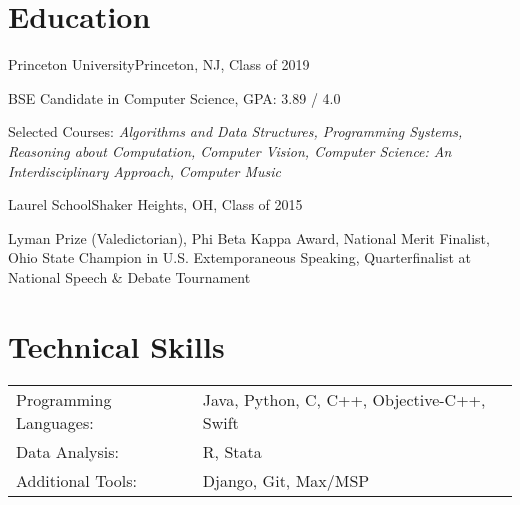 \documentclass[12pt]{my_resume}
\begin{document}
\vspace{-6pt}

\section{Education}

\begin{resitem}{Princeton University}{Princeton, NJ, Class of 2019}
  \item BSE Candidate in Computer Science, GPA: 3.89 / 4.0
  \item Selected Courses: \textit{Algorithms and Data Structures, %
  Programming Systems, Reasoning about Computation, Computer Vision, %
  Computer Science: An Interdisciplinary Approach, Computer Music}
\end{resitem}

\vspace{-8pt}

\begin{resitem}{Laurel School}{Shaker Heights, OH, Class of 2015}
  \item Lyman Prize (Valedictorian), Phi Beta Kappa Award, %
  National Merit Finalist, Ohio State Champion in %
  U.S. Extemporaneous Speaking, Quarterfinalist at National Speech \& %
  Debate Tournament
\end{resitem}

\section{Technical Skills}

\vspace{-6pt}
\begin{tabular}{l l}%
Programming Languages: & Java, Python, C, C++, Objective-C++, Swift\\
Data Analysis: & R, Stata\\
Additional Tools: & Django, Git, Max/MSP\\
\end{tabular}

\end{document}
